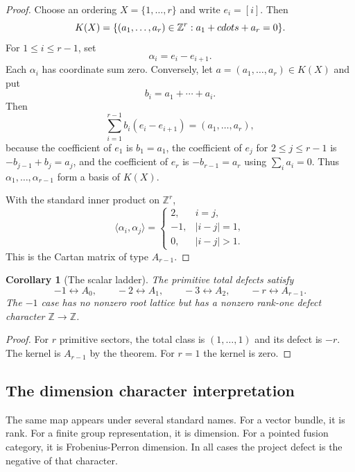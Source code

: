 \documentclass[11pt]{amsart}
\newtheorem{corollary}[theorem]{Corollary}
\newcommand{\ZZ}{\mathbb Z}
\begin{document}
\begin{proof}
Choose an ordering $X=\{1,\ldots,r\}$ and write $e_i=[i]$.  Then
\[
       K(X)=\{(a_1,\ldots,a_r)\in\ZZ^r:a_1+\\cdots+a_r=0\}.
\]
For $1\le i\le r-1$, set
\[
       \alpha_i=e_i-e_{i+1}.
\]
Each $\alpha_i$ has coordinate sum zero.  Conversely, let $a=(a_1,\ldots,a_r)\in K(X)$ and put
\[
       b_i=a_1+\cdots+a_i.
\]
Then
\[
       \sum_{i=1}^{r-1}b_i(e_i-e_{i+1})=(a_1,\ldots,a_r),
\]
because the coefficient of $e_1$ is $b_1=a_1$, the coefficient of $e_j$ for $2\le j\le r-1$ is $-b_{j-1}+b_j=a_j$, and the coefficient of $e_r$ is $-b_{r-1}=a_r$ using $\sum_i a_i=0$.  Thus $\alpha_1,\ldots,\alpha_{r-1}$ form a basis of $K(X)$.

With the standard inner product on $\ZZ^r$,
\[
      \langle \alpha_i,\alpha_j\rangle
      =
      \begin{cases}
      2,&i=j,\\
      -1,&|i-j|=1,\\
      0,&|i-j|>1.
      \end{cases}
\]
This is the Cartan matrix of type $A_{r-1}$.\end{proof}

\begin{corollary}[The scalar ladder]
The primitive total defects satisfy
\[
       -1\leftrightarrow A_0,
       \qquad
       -2\leftrightarrow A_1,
       \qquad
       -3\leftrightarrow A_2,
       \qquad
       -r\leftrightarrow A_{r-1}.
\]
The $-1$ case has no nonzero root lattice but has a nonzero rank-one defect character $\ZZ\to\ZZ$.
\end{corollary}

\begin{proof}
For $r$ primitive sectors, the total class is $(1,\ldots,1)$ and its defect is $-r$.  The kernel is $A_{r-1}$ by the theorem.  For $r=1$ the kernel is zero.\end{proof}

\subsection{The dimension character interpretation}

The same map appears under several standard names.  For a vector bundle, it is rank.  For a finite group representation, it is dimension.  For a pointed fusion category, it is Frobenius-Perron dimension.  In all cases the project defect is the negative of that character.
\end{document}
